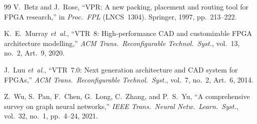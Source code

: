 \documentclass[journal]{IEEEtran}
\begin{document}
\begin{thebibliography}{99}
V.~Betz and J.~Rose, ``VPR: A new packing, placement and routing tool for FPGA research,'' in \emph{Proc.\ FPL} (LNCS~1304). Springer, 1997, pp.~213--222.

K.~E.~Murray \emph{et~al.}, ``VTR~8: High-performance CAD and customizable FPGA architecture modelling,'' \emph{ACM Trans.\ Reconfigurable Technol.\ Syst.}, vol.~13, no.~2, Art.~9, 2020.

J.~Luu \emph{et~al.}, ``VTR~7.0: Next generation architecture and CAD system for FPGAs,'' \emph{ACM Trans.\ Reconfigurable Technol.\ Syst.}, vol.~7, no.~2, Art.~6, 2014.

Z.~Wu, S.~Pan, F.~Chen, G.~Long, C.~Zhang, and P.~S.~Yu, ``A comprehensive survey on graph neural networks,'' \emph{IEEE Trans.\ Neural Netw.\ Learn.\ Syst.}, vol.~32, no.~1, pp.~4--24, 2021.

\end{thebibliography}
\end{document}
